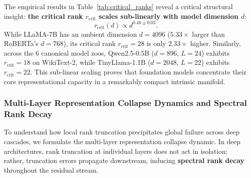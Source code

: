 The empirical results in Table~\ref{tab:critical_ranks} reveal a critical structural insight: \textbf{the critical rank $r_{\text{crit}}$ scales sub-linearly with model dimension $d$}:
\begin{equation}
r_{\text{crit}}(d) \propto d^{0.46 \pm 0.03}.
\end{equation}
While LLaMA-7B has an ambient dimension $d=4096$ ($5.33\times$ larger than RoBERTa's $d=768$), its critical rank $r_{\text{crit}} = 28$ is only $2.33\times$ higher. Similarly, across the 6 canonical model zoos, Qwen2.5-0.5B ($d=896$, $L=24$) exhibits $r_{\text{crit}} = 18$ on WikiText-2, while TinyLlama-1.1B ($d=2048$, $L=22$) exhibits $r_{\text{crit}} = 22$. This sub-linear scaling proves that foundation models concentrate their core representational capacity in a remarkably compact intrinsic manifold.

\subsubsection{Multi-Layer Representation Collapse Dynamics and Spectral Rank Decay}
\label{sec:phenom_multilayer_collapse}

To understand how local rank truncation precipitates global failure across deep cascades, we formulate the multi-layer representation collapse dynamic. In deep architectures, rank truncation at individual layers does not act in isolation; rather, truncation errors propagate downstream, inducing \textbf{spectral rank decay} throughout the residual stream.

